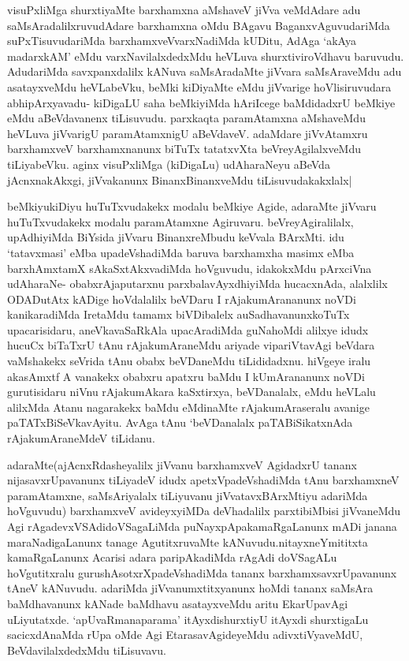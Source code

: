 \begin{artha}

visuPxliMga shurxtiyaMte barxhamxna aMshaveV jiVva veMdAdare adu
saMsAradalilxruvudAdare barxhamxna oMdu BAgavu BaganxvAguvudariMda
suPxTisuvudariMda barxhamxveVvarxNadiMda kUDitu, AdAga `akAya
madarxkAM' eMdu varxNavilalxdedxMdu heVLuva shurxtiviroVdhavu
baruvudu. AdudariMda savxpanxdalilx kANuva saMsAradaMte jiVvara
saMsAraveMdu adu asatayxveMdu heVLabeVku, beMki kiDiyaMte eMdu
jiVvarige hoVlisiruvudara abhipArxyavadu- kiDigaLU saha beMkiyiMda
hAriIcege baMdidadxrU beMkiye eMdu aBeVdavanenx tiLisuvudu. parxkaqta
paramAtamxna aMshaveMdu heVLuva jiVvarigU paramAtamxnigU
aBeVdaveV. adaMdare jiVvAtamxru barxhamxveV barxhamxnanunx biTuTx
tatatxvXta beVreyAgilalxveMdu tiLiyabeVku. aginx visuPxliMga
(kiDigaLu) udAharaNeyu aBeVda jAcnxnakAkxgi, jiVvakanunx
BinanxBinanxveMdu tiLisuvudakakxlalx|
\end{artha}

\begin{artha}
beMkiyukiDiyu huTuTxvudakekx modalu beMkiye Agide, adaraMte jiVvaru
huTuTxvudakekx modalu paramAtamxne Agiruvaru. beVreyAgiralilalx,
upAdhiyiMda BiYsida jiVvaru BinanxreMbudu keVvala BArxMti. idu
`tatavxmasi' eMba upadeVshadiMda baruva barxhamxha masimx eMba
barxhAmxtamX sAkaSxtAkxvadiMda hoVguvudu, idakokxMdu pArxciVna
udAharaNe- obabxrAjaputarxnu parxbalavAyxdhiyiMda hucacxnAda,
alalxlilx ODADutAtx kADige hoVdalalilx beVDaru I rAjakumArananunx
noVDi kanikaradiMda IretaMdu tamamx biVDibalelx auSadhavanunxkoTuTx
upacarisidaru, aneVkavaSaRkAla upacAradiMda guNahoMdi alilxye idudx
hucuCx biTaTxrU tAnu rAjakumAraneMdu ariyade vipariVtavAgi beVdara
vaMshakekx seVrida tAnu obabx beVDaneMdu tiLididadxnu. hiVgeye iralu
akasAmxtf A vanakekx obabxru apatxru baMdu I kUmArananunx noVDi
gurutisidaru niVnu rAjakumAkara  kaSxtirxya, beVDanalalx, eMdu
heVLalu alilxMda Atanu nagarakekx baMdu eMdinaMte rAjakumAraseralu
avanige paTATxBiSeVkavAyitu. AvAga tAnu `beVDanalalx paTABiSikatxnAda
rAjakumAraneMdeV tiLidanu.
\end{artha}

\begin{artha}
adaraMte(ajAcnxRdasheyalilx jiVvanu barxhamxveV AgidadxrU tananx
nijasavxrUpavanunx tiLiyadeV idudx apetxVpadeVshadiMda tAnu
barxhamxneV paramAtamxne, saMsAriyalalx tiLiyuvanu jiVvatavxBArxMtiyu
adariMda hoVguvudu) barxhamxveV avideyxyiMDa deVhadalilx parxtibiMbisi
jiVvaneMdu Agi rAgadevxVSAdidoVSagaLiMda puNayxpApakamaRgaLanunx mADi
janana maraNadigaLanunx tanage AgutitxruvaMte
kANuvudu.nitayxneYmititxta kamaRgaLanunx Acarisi adara paripAkadiMda
rAgAdi doVSagALu hoVgutitxralu gurushAsotxrXpadeVshadiMda tananx
barxhamxsavxrUpavanunx tAneV kANuvudu. adariMda jiVvanumxtitxyanunx
hoMdi tananx saMsAra baMdhavanunx kANade baMdhavu asatayxveMdu aritu
EkarUpavAgi uLiyutatxde. `apUvaRmanaparama' itAyxdishurxtiyU itAyxdi
shurxtigaLu sacicxdAnaMda rUpa oMde Agi EtarasavAgideyeMdu
adivxtiVyaveMdU, BeVdavilalxdedxMdu tiLisuvavu.
\end{artha}


\begin{shl}

\end{shl}
